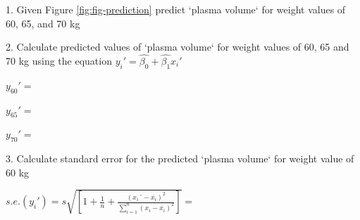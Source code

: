 \documentclass[12pt]{article}\usepackage[]{graphicx}\usepackage[]{color}
\begin{document}
1. Given Figure \ref{fig:fig-prediction} predict `plasma volume` for weight values of 60, 65, and 70 kg

2. Calculate predicted values of `plasma volume` for weight values of 60, 65 and 70 kg using the equation  $y_i'=\hat{\beta_0}+\hat{\beta_1}x_i'$

$y_{60}'=$ \vspace{0.2cm}

$y_{65}'=$ \vspace{0.2cm}

$y_{70}'=$ \vspace{0.2cm}


3. Calculate standard error for the predicted `plasma volume` for weight value of 60 kg \newline \vspace{0.4cm}

$s.e.(y_i')=s\sqrt{[1+\frac{1}{n}+\frac{(x_i´-\overline{x_i})^2}{\sum_{i=1}^{n}(x_i-\overline{x_i})^2}]}=$ \vspace{0.2cm}
\end{document}
